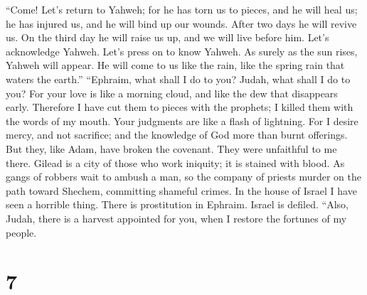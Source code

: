 ``Come! Let's return to Yahweh; for he has torn us to pieces, and he
will heal us; he has injured us, and he will bind up our wounds.
 After two days he will revive us. On the third day he will
raise us up, and we will live before him.  Let's acknowledge
Yahweh. Let's press on to know Yahweh. As surely as the sun rises,
Yahweh will appear. He will come to us like the rain, like the spring
rain that waters the earth.''  ``Ephraim, what shall I do to
you? Judah, what shall I do to you? For your love is like a morning
cloud, and like the dew that disappears early.  Therefore I
have cut them to pieces with the prophets; I killed them with the words
of my mouth. Your judgments are like a flash of lightning. 
For I desire mercy, and not sacrifice; and the knowledge of God more
than burnt offerings.  But they, like Adam, have broken the
covenant. They were unfaithful to me there.  Gilead is a
city of those who work iniquity; it is stained with blood. 
As gangs of robbers wait to ambush a man, so the company of priests
murder on the path toward Shechem, committing shameful crimes.
 In the house of Israel I have seen a horrible thing. There
is prostitution in Ephraim. Israel is defiled.  ``Also,
Judah, there is a harvest appointed for you, when I restore the fortunes
of my people.

\hypertarget{section-4}{%
\section{7}\label{section-4}}

